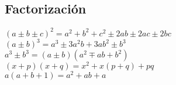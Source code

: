\subsection{Factorización}
$ (a \pm b \pm c)^2 = a^2 + b^2 + c^2 \pm 2ab \pm 2ac \pm 2bc $\\
$(a \pm b)^3 = a^3 \pm 3a^2b + 3ab^2 \pm b^3$\\
$ a^3 \pm b^3 = (a \pm b)(a^2 \mp ab + b^2)$\\
$ (x + p)(x + q) = x^2 + x(p + q) + pq $\\
$ a (a + b + 1) = a^2 + ab + a $\\